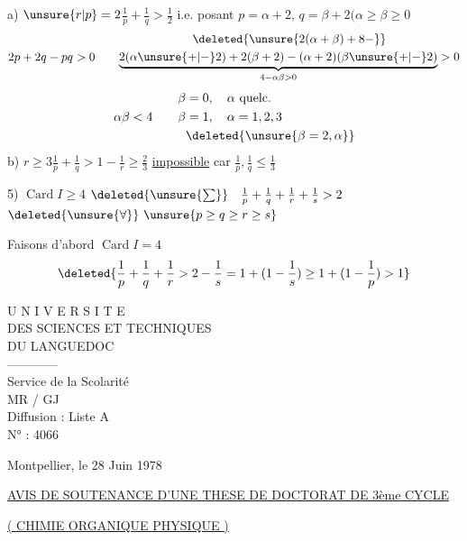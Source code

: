  a) $\unsure{r|p}=2$\qquad $\frac1p+\frac1q>\frac12$\qquad
 i.e. posant $p=\alpha+2$, $q=\beta+2$\qquad $(\alpha\ge\beta\ge0$
\margin{\deleted{$\unsure{\alpha}$}}
\[
2p+2q-pq>0\qquad
\begin{gathered}
\deleted{\unsure{2(\alpha+\beta)+8-}}\\
\underbrace{2(\alpha\unsure{+|-}2)+2(\beta+2)-(\alpha+2)(\beta\unsure{+|-}2)}_{4-\alpha\beta>0}>0
\end{gathered}
\]
\[
\alpha\beta<4\qquad
\begin{aligned}
\beta&=0,\quad\alpha\ \text{quelc.}\\
\beta&=1,\quad\alpha=1,2,3\\
&\deleted{\unsure{\beta=2,\alpha}}
\end{aligned}
\]
\diagram{\[
\left\{\begin{array}{lll}
(2,2,p)&p\ge2\ \text{quelc.}&N=2p\\
(2,3,3)&&N=12\\
(2,3,4)&&N=24\\
(2,3,5)&&N=60
\end{array}\right.
\]}
b) $r\ge3$\qquad $\frac1p+\frac1q>1-\frac1r\ge\frac23$\qquad
\uline{impossible} car $\frac1p,\frac1q\le\frac13$

5) $\operatorname{Card}I\ge4$\qquad
$\deleted{\unsure{\sum}}\quad\frac1p+\frac1q+\frac1r+\frac1s>2$\qquad
$\deleted{\unsure{\forall}}\ \unsure{p\ge q\ge r\ge s}$

Faisons d'abord $\operatorname{Card}I=4$
\[
\deleted{\frac1p+\frac1q+\frac1r>2-\frac1s=1+(1-\frac1s)\ge1+(1-\frac1p)>1}
\]

\begin{minipage}{.45\linewidth}\centering
U N I V E R S I T E\\
DES SCIENCES ET TECHNIQUES\\
DU LANGUEDOC\\
------------\\
Service de la Scolarité\\
MR / GJ\\
Diffusion : Liste A\\
N° : 4066
\end{minipage}\hfill
\begin{minipage}{.48\linewidth}
Montpellier, le 28 Juin 1978
\end{minipage}

\begin{center}
\uline{AVIS DE SOUTENANCE D'UNE THESE DE DOCTORAT DE 3ème CYCLE}

\uline{( CHIMIE ORGANIQUE PHYSIQUE )}
\end{center}

